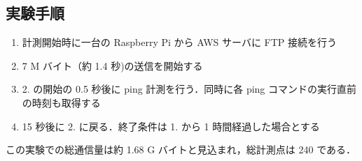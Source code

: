 \documentclass[a4j]{jarticle}
\begin{document}
\subsection{実験手順}
\begin{enumerate}
\item 計測開始時に一台の Raspberry Pi から AWS サーバに FTP 接続を行う
\item 7 M バイト（約 1.4 秒)の送信を開始する
\item 2. の開始の 0.5 秒後に ping 計測を行う．同時に各 ping コマンドの実行直前の時刻も取得する
\item 15 秒後に 2. に戻る．終了条件は 1. から 1 時間経過した場合とする
\end{enumerate}
この実験での総通信量は約 1.68 G バイトと見込まれ，総計測点は 240 である．
\end{document}
